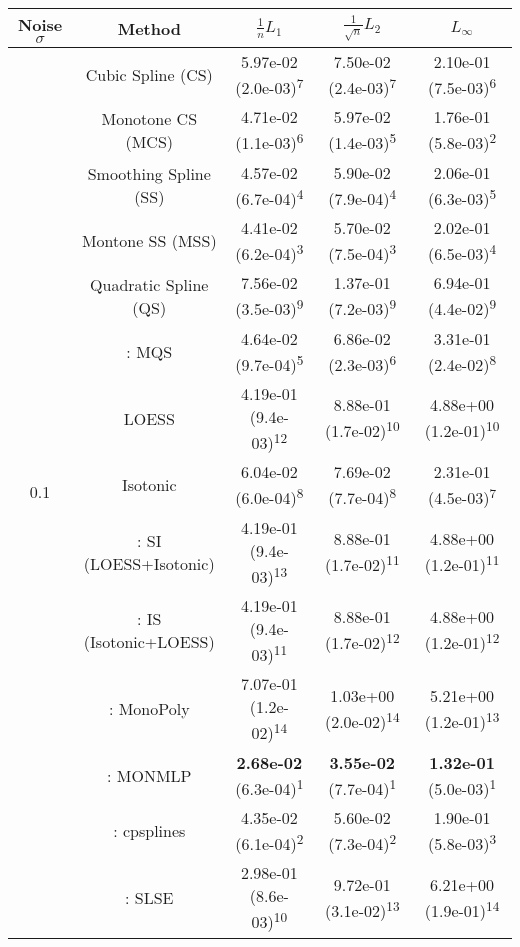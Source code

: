 \begin{tabular}{ccccc}
\toprule
Noise $\sigma$ & Method&$\frac 1n L_1$&$\frac{1}{\sqrt n}L_2$&$L_\infty$\tabularnewline
\midrule
\multirow{14}{*}{0.1}&Cubic Spline (CS)& 5.97e-02 (2.0e-03)\textsuperscript{7}& 7.50e-02 (2.4e-03)\textsuperscript{7}& 2.10e-01 (7.5e-03)\textsuperscript{6}\tabularnewline
&Monotone CS (MCS)& 4.71e-02 (1.1e-03)\textsuperscript{6}& 5.97e-02 (1.4e-03)\textsuperscript{5}& 1.76e-01 (5.8e-03)\textsuperscript{2}\tabularnewline
&Smoothing Spline (SS)& 4.57e-02 (6.7e-04)\textsuperscript{4}& 5.90e-02 (7.9e-04)\textsuperscript{4}& 2.06e-01 (6.3e-03)\textsuperscript{5}\tabularnewline
&Montone SS (MSS)& 4.41e-02 (6.2e-04)\textsuperscript{3}& 5.70e-02 (7.5e-04)\textsuperscript{3}& 2.02e-01 (6.5e-03)\textsuperscript{4}\tabularnewline
&Quadratic Spline (QS)& 7.56e-02 (3.5e-03)\textsuperscript{9}& 1.37e-01 (7.2e-03)\textsuperscript{9}& 6.94e-01 (4.4e-02)\textsuperscript{9}\tabularnewline
&\textcite{heMonotoneBsplineSmoothing1998}: MQS& 4.64e-02 (9.7e-04)\textsuperscript{5}& 6.86e-02 (2.3e-03)\textsuperscript{6}& 3.31e-01 (2.4e-02)\textsuperscript{8}\tabularnewline
&LOESS& 4.19e-01 (9.4e-03)\textsuperscript{12}& 8.88e-01 (1.7e-02)\textsuperscript{10}& 4.88e+00 (1.2e-01)\textsuperscript{10}\tabularnewline
&Isotonic& 6.04e-02 (6.0e-04)\textsuperscript{8}& 7.69e-02 (7.7e-04)\textsuperscript{8}& 2.31e-01 (4.5e-03)\textsuperscript{7}\tabularnewline
&\textcite{mammenEstimatingSmoothMonotone1991}: SI (LOESS+Isotonic)& 4.19e-01 (9.4e-03)\textsuperscript{13}& 8.88e-01 (1.7e-02)\textsuperscript{11}& 4.88e+00 (1.2e-01)\textsuperscript{11}\tabularnewline
&\textcite{mammenEstimatingSmoothMonotone1991}: IS (Isotonic+LOESS)& 4.19e-01 (9.4e-03)\textsuperscript{11}& 8.88e-01 (1.7e-02)\textsuperscript{12}& 4.88e+00 (1.2e-01)\textsuperscript{12}\tabularnewline
&\textcite{murrayFastFlexibleMethods2016a}: MonoPoly& 7.07e-01 (1.2e-02)\textsuperscript{14}& 1.03e+00 (2.0e-02)\textsuperscript{14}& 5.21e+00 (1.2e-01)\textsuperscript{13}\tabularnewline
&\textcite{cannonMonmlpMultilayerPerceptron2017}: MONMLP& \textbf{2.68e-02} (6.3e-04)\textsuperscript{1}& \textbf{3.55e-02} (7.7e-04)\textsuperscript{1}& \textbf{1.32e-01} (5.0e-03)\textsuperscript{1}\tabularnewline
&\textcite{navarro-garciaConstrainedSmoothingOutofrange2023}: cpsplines& 4.35e-02 (6.1e-04)\textsuperscript{2}& 5.60e-02 (7.3e-04)\textsuperscript{2}& 1.90e-01 (5.8e-03)\textsuperscript{3}\tabularnewline
&\textcite{groeneboomConfidenceIntervalsMonotone2023}: SLSE& 2.98e-01 (8.6e-03)\textsuperscript{10}& 9.72e-01 (3.1e-02)\textsuperscript{13}& 6.21e+00 (1.9e-01)\textsuperscript{14}\tabularnewline

\end{tabular}

